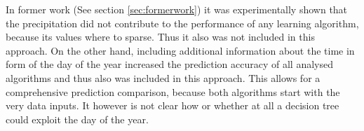 \documentclass[conference]{IEEEtran}
\begin{document}
In former work (See section \ref{sec:formerwork}) it was experimentally shown that the precipitation did not contribute to the performance of any learning algorithm, because its values where to sparse. Thus it also was not included in this approach.  
On the other hand, including additional information about the time in form of the day of the year increased the prediction accuracy of all analysed algorithms and thus also was included in this approach. This allows for a comprehensive prediction comparison, because both algorithms start with the very data inputs. It however is not clear how or whether at all a decision tree could exploit the day of the year.


\end{document}
